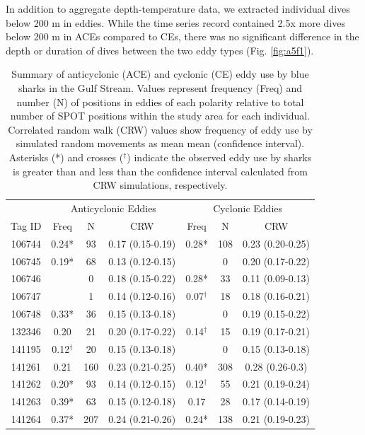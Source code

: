 In addition to aggregate depth-temperature data, we extracted individual dives below 200 m in eddies. While the time series record contained 2.5x more dives below 200 m in ACEs compared to CEs, there was no significant difference in the depth or duration of dives between the two eddy types (Fig. \cref{fig:a5f1}).

\begin{table}
\caption[Summary of anticyclonic and cyclonic eddy use by blue sharks in the Gulf Stream]{Summary of anticyclonic (ACE) and cyclonic (CE) eddy use by blue sharks in the Gulf Stream. Values represent frequency (Freq) and number (N) of positions in eddies of each polarity relative to total number of SPOT positions within the study area for each individual. Correlated random walk (CRW) values show frequency of eddy use by simulated random movements as mean mean (confidence interval). Asterisks (*) and crosses ($^{\dagger}$) indicate the observed eddy use by sharks is greater than and less than the confidence interval calculated from CRW simulations, respectively.}
\label{tab:c5t2}
\centering
\begin{tabular}[t]{ccccccc}
\toprule
 & \multicolumn{3}{c}{Anticyclonic Eddies} & \multicolumn{3}{c}{Cyclonic Eddies} \\
Tag ID & Freq & N & CRW & Freq & N & CRW\\
\midrule
106744 & 0.24* & 93 & 0.17 (0.15-0.19) & 0.28* & 108 & 0.23 (0.20-0.25)\\
106745 & 0.19* & 68 & 0.13 (0.12-0.15) &  & 0 & 0.20 (0.17-0.22)\\
106746 &  & 0 & 0.18 (0.15-0.22) & 0.28* & 33 & 0.11 (0.09-0.13)\\
106747 &  & 1 & 0.14 (0.12-0.16) & 0.07$^{\dagger}$ & 18 & 0.18 (0.16-0.21)\\
106748 & 0.33* & 36 & 0.15 (0.13-0.18) &  & 0 & 0.19 (0.15-0.22)\\
132346 & 0.20 & 21 & 0.20 (0.17-0.22) & 0.14$^{\dagger}$ & 15 & 0.19 (0.17-0.21)\\
141195 & 0.12$^{\dagger}$ & 20 & 0.15 (0.13-0.18) &  & 0 & 0.15 (0.13-0.18)\\
141261 & 0.21 & 160 & 0.23 (0.21-0.25) & 0.40* & 308 & 0.28 (0.26-0.3)\\
141262 & 0.20* & 93 & 0.14 (0.12-0.15) & 0.12$^{\dagger}$ & 55 & 0.21 (0.19-0.24)\\
141263 & 0.39* & 63 & 0.15 (0.12-0.18) & 0.17 & 28 & 0.17 (0.14-0.19)\\
141264 & 0.37* & 207 & 0.24 (0.21-0.26) & 0.24* & 138 & 0.21 (0.19-0.23)\\

\end{tabular}
\end{table}
